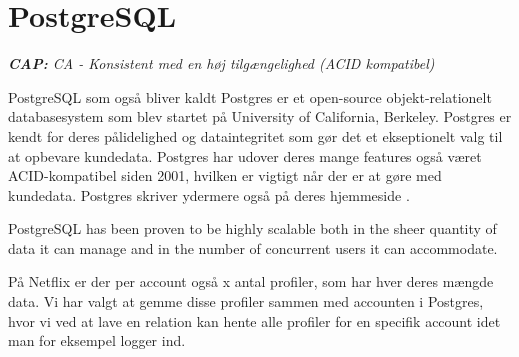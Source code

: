 \section{PostgreSQL}
\begin{displayquote}
    \textit{\textbf{CAP:} CA - Konsistent med en høj tilgængelighed (ACID kompatibel)}
\end{displayquote}

PostgreSQL som også bliver kaldt Postgres er et open-source objekt-relationelt databasesystem som blev startet på University of California, Berkeley. Postgres er kendt for deres pålidelighed og dataintegritet som gør det et ekseptionelt valg til at opbevare kundedata. Postgres har udover deres mange features også været ACID-kompatibel siden 2001, hvilken er vigtigt når der er at gøre med kundedata. Postgres skriver ydermere også på deres hjemmeside \cite{postgresabout}.
\begin{displayquote}
    PostgreSQL has been proven to be highly scalable both in the sheer quantity of data it can manage and in the number of concurrent users it can accommodate.
\end{displayquote}
På Netflix er der per account også x antal profiler, som har hver deres mængde data. Vi har valgt at gemme disse profiler sammen med accounten i Postgres, hvor vi ved at lave en relation kan hente alle profiler for en specifik account idet man for eksempel logger ind. 